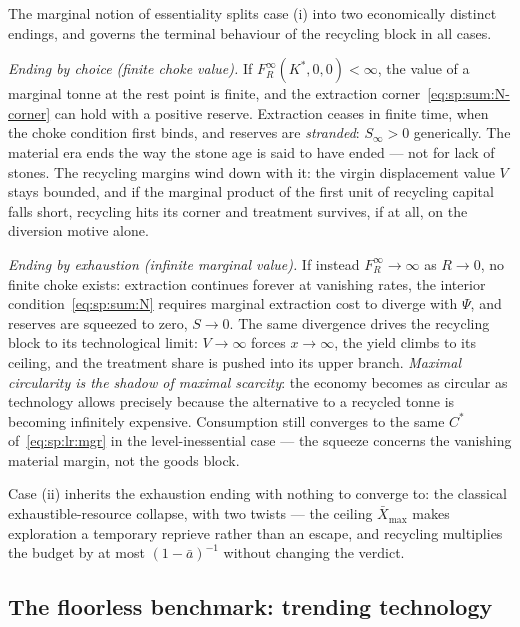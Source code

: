  The marginal notion of essentiality splits case (i) into two economically distinct endings, and governs the terminal behaviour of the recycling block in all cases.

\emph{Ending by choice (finite choke value).} If $F^\infty_R\left(K^*,0,0\right)<\infty$, the value of a marginal tonne at the rest point is finite, and the extraction corner~\eqref{eq:sp:sum:N-corner} can hold with a positive reserve. Extraction ceases in finite time, when the choke condition first binds, and reserves are \emph{stranded}: $S_\infty>0$ generically. The material era ends the way the stone age is said to have ended --- not for lack of stones. The recycling margins wind down with it: the virgin displacement value $V$ stays bounded, and if the marginal product of the first unit of recycling capital falls short, recycling hits its corner and treatment survives, if at all, on the diversion motive alone.

\emph{Ending by exhaustion (infinite marginal value).} If instead $F^\infty_R\to\infty$ as $R\to0$, no finite choke exists: extraction continues forever at vanishing rates, the interior condition~\eqref{eq:sp:sum:N} requires marginal extraction cost to diverge with $\Psi$, and reserves are squeezed to zero, $S\to0$. The same divergence drives the recycling block to its technological limit: $V\to\infty$ forces $x\to\infty$, the yield climbs to its ceiling, and the treatment share is pushed into its upper branch. \emph{Maximal circularity is the shadow of maximal scarcity}: the economy becomes as circular as technology allows precisely because the alternative to a recycled tonne is becoming infinitely expensive. Consumption still converges to the same $C^*$ of~\eqref{eq:sp:lr:mgr} in the level-inessential case --- the squeeze concerns the vanishing material margin, not the goods block.

Case (ii) inherits the exhaustion ending with nothing to converge to: the classical exhaustible-resource collapse, with two twists --- the ceiling $\bar X_{\max}$ makes exploration a temporary reprieve rather than an escape, and recycling multiplies the budget by at most $\left(1-\bar a\right)^{-1}$ without changing the verdict.

\subsection{The floorless benchmark: trending technology}\label{sec:sp:longrun:trend}

